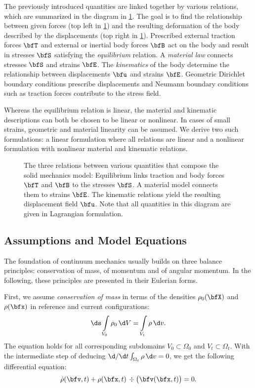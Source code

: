 The previously introduced quantities are linked together by various relations, which are summarized in the diagram in \cref{fig:tonti_diagram}. The goal is to find the relationship between given forces (top left in \cref{fig:tonti_diagram}) and the resulting deformation of the body described by the displacements (top right in \cref{fig:tonti_diagram}).
Prescribed external traction forces $\bfT$ and external or inertial body forces $\bfB$ act on the body and result in stresses $\bfS$ satisfying the \emph{equilibrium} relation. A \emph{material law} connects stresses $\bfS$ and strains $\bfE$. The \emph{kinematics} of the body determine the relationship between displacements $\bfu$ and strains $\bfE$. Geometric Dirichlet boundary conditions prescribe displacements and Neumann boundary conditions such as traction forces contribute to the stress field. 

Whereas the equilibrium relation is linear, the material and kinematic descriptions can both be chosen to be linear or nonlinear. 
In cases of small strains, geometric and material linearity can be assumed. We derive two such formulations: a linear formulation where all relations are linear and a nonlinear formulation with nonlinear material and kinematic relations.

\begin{figure}
  \centering%
  \def\svgwidth{\textwidth}
  \caption{The three relations between various quantities that compose the solid mechanics model: Equilibrium links traction and body forces $\bfT$ and $\bfB$ to the stresses $\bfS$. A material model connects them to strains $\bfE$. The kinematic relations yield the resulting displacement field $\bfu$. Note that all quantities in this diagram are given in Lagrangian formulation.}%
  \label{fig:tonti_diagram}%
\end{figure}

\subsection{Assumptions and Model Equations}\label{sec:assumptions_and_model_equations}

The foundation of continuum mechanics usually builds on three balance principles: conservation of mass, of momentum and of angular momentum. In the following, these principles are presented in their Eulerian forms.

First, we assume \emph{conservation of mass} in terms of the densities $\rho_0(\bfX)$ and $\rho(\bfx)$ in reference and current configurations:
%
\begin{align*}
  \ds\int\limits_{V_0} \rho_0\,\d V = \int\limits_{V_t} \rho \,\d v.
\end{align*}
%
The equation holds for all corresponding subdomains $V_0\subset \Omega_0$ and $V_t \subset \Omega_t$. With the intermediate step of deducing $\d/\d t \int_{\Omega_t} \rho \,\d v=0$, we get the following differential equation:%
\begin{align}\label{eq:contraction_helper1}
  \dot{\rho}(\bfv,t) + \rho(\bfx,t)\,\div\big(\bfv(\bfx,t)\big) = 0.
\end{align}
%

